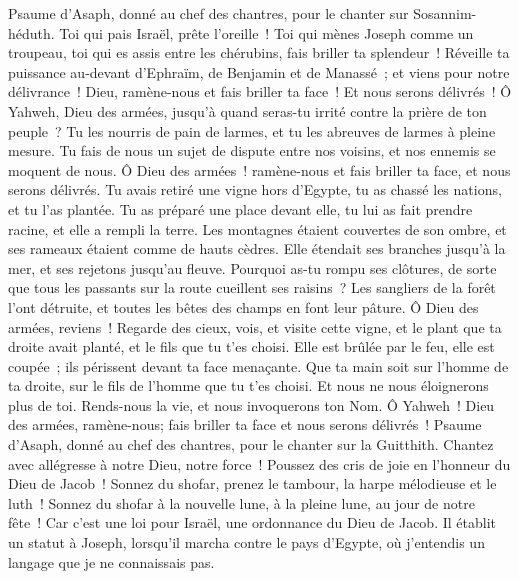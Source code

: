 \begin{multicols}{2}
\VerseOne{}Psaume d'Asaph, donné au chef des chantres, pour le chanter sur Sosannim-héduth.
Toi qui pais Israël, prête l'oreille~! Toi qui mènes Joseph comme un troupeau, toi qui es assis entre les chérubins, fais briller ta splendeur~!
Réveille ta puissance au-devant d'Ephraïm, de Benjamin et de Manassé~; et viens pour notre délivrance~!
Dieu, ramène-nous et fais briller ta face~! Et nous serons délivrés~!
Ô Yahweh, Dieu des armées, jusqu'à quand seras-tu irrité contre la prière de ton peuple~?
Tu les nourris de pain de larmes, et tu les abreuves de larmes à pleine mesure.
Tu fais de nous un sujet de dispute entre nos voisins, et nos ennemis se moquent de nous.
Ô Dieu des armées~! ramène-nous et fais briller ta face, et nous serons délivrés.
Tu avais retiré une vigne hors d'Egypte, tu as chassé les nations, et tu l'as plantée.
Tu as préparé une place devant elle, tu lui as fait prendre racine, et elle a rempli la terre.
Les montagnes étaient couvertes de son ombre, et ses rameaux étaient comme de hauts cèdres.
Elle étendait ses branches jusqu'à la mer, et ses rejetons jusqu'au fleuve.
Pourquoi as-tu rompu ses clôtures, de sorte que tous les passants sur la route cueillent ses raisins~?
Les sangliers de la forêt l'ont détruite, et toutes les bêtes des champs en font leur pâture.
Ô Dieu des armées, reviens~! Regarde des cieux, vois, et visite cette vigne,
et le plant que ta droite avait planté, et le fils que tu t'es choisi.
Elle est brûlée par le feu, elle est coupée~; ils périssent devant ta face menaçante.
Que ta main soit sur l'homme de ta droite, sur le fils de l'homme que tu t'es choisi.
Et nous ne nous éloignerons plus de toi. Rends-nous la vie, et nous invoquerons ton Nom.
Ô Yahweh~! Dieu des armées, ramène-nous; fais briller ta face et nous serons délivrés~!
\VerseOne{}Psaume d'Asaph, donné au chef des chantres, pour le chanter sur la Guitthith.
Chantez avec allégresse à notre Dieu, notre force~! Poussez des cris de joie en l'honneur du Dieu de Jacob~!
Sonnez du shofar, prenez le tambour, la harpe mélodieuse et le luth~!
Sonnez du shofar à la nouvelle lune, à la pleine lune, au jour de notre fête~!
Car c'est une loi pour Israël, une ordonnance du Dieu de Jacob.
Il établit un statut à Joseph, lorsqu'il marcha contre le pays d'Egypte, où j'entendis un langage que je ne connaissais pas.

\end{multicols}
